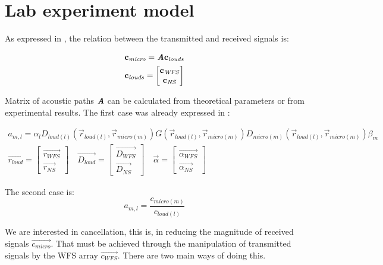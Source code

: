 \section{Lab experiment model} \label{optimization}
As expressed in , the relation between the transmitted and received signals is:

\begin{gather}
\mathbf{c_\mathit{micro}} = \bm{\mathit{A}} \mathbf{c_\mathit{louds}} \\
\mathbf{c_\mathit{louds}} = 
\begin{bmatrix}
	\mathbf{c_\mathit{WFS}} \\
	\mathbf{c_\mathit{NS}}
\end{bmatrix}
\label{transEqMatrixRep1}
\end{gather}

Matrix of acoustic paths $\bm{\mathit{A}}$ can be calculated from theoretical parameters or from experimental results. The first case was already expressed in :

\begin{gather}
a_{m,l} = \alpha_l D_{loud (l)}(\vec{r}_{loud (l)}, \vec{r}_{micro (m)}) G(\vec{r}_{loud (l)}, \vec{r}_{micro (m)}) D_{micro (m)}(\vec{r}_{loud (l)}, \vec{r}_{micro (m)}) \beta_m 
\label{acPathTheoricRep1} \\
\vec{r_\mathit{loud}} =
\begin{bmatrix}
	\vec{r_\mathit{WFS}} \\
	\vec{r_\mathit{NS}}
\end{bmatrix}
\quad
\vec{D_\mathit{loud}} =
\begin{bmatrix}
	\vec{D_\mathit{WFS}} \\
	\vec{D_\mathit{NS}}
\end{bmatrix} 
\quad
\vec{\alpha} =
\begin{bmatrix}
	\vec{\alpha_\mathit{WFS}} \\
	\vec{\alpha_\mathit{NS}}
\end{bmatrix}
\label{WFSandNSconcatenation}
\end{gather}

The second case is:
\begin{equation}
a_{m, l} = \frac{c_{\mathit{micro} (m)}}{c_{\mathit{loud} (l)}}
\end{equation}

We are interested in cancellation, this is, in reducing the magnitude of received signals $\vec{c_\mathit{micro}}$. That must be achieved through the manipulation of transmitted signals by the WFS array $\vec{c_\mathit{WFS}}$. There are two main ways of doing this.

